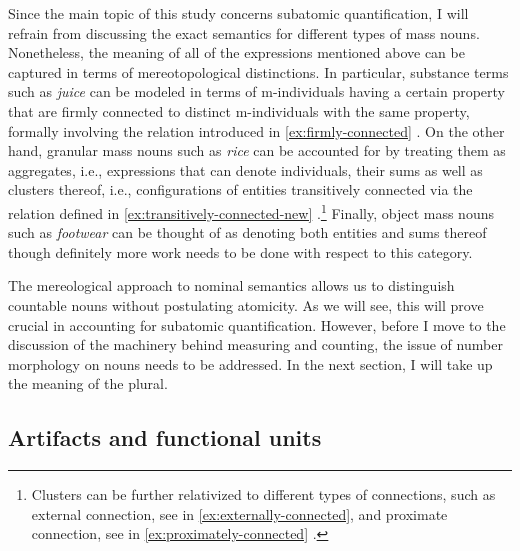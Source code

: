 	Since the main topic of this study concerns subatomic quantification, I will refrain from discussing the exact semantics for different types of mass nouns. Nonetheless, the meaning of all of the expressions mentioned above can be captured in terms of mereotopological distinctions. In particular, substance terms such as \textit{juice} can be modeled in terms of m-individuals having a certain property that are firmly connected to distinct m-individuals with the same property, formally involving the  relation introduced in \ref{ex:firmly-connected} \citep[see][pp. 140--142]{grimm2012number}. On the other hand, granular mass nouns such as \textit{rice} can be accounted for by treating them as aggregates, i.e., expressions that can denote  individuals, their sums as well as clusters thereof, i.e., configurations of  entities transitively connected via the  relation defined in \ref{ex:transitively-connected-new} \citep[see][pp. 142--148]{grimm2012number}.\footnote{Clusters can be further relativized to different types of connections, such as external connection, see  in \ref{ex:externally-connected}, and proximate connection, see  in \ref{ex:proximately-connected} \citep{grimm2012number}.} Finally, object mass nouns such as \textit{footwear} can be thought of as denoting both  entities and sums thereof though definitely more work needs to be done with respect to this category.
	
	\begin{sloppypar}
	The mereological approach to nominal semantics allows us to distinguish countable nouns without postulating atomicity. As we will see, this will prove crucial in accounting for subatomic quantification. However, before I move to the discussion of the machinery behind measuring and counting, the issue of number morphology on nouns needs to be addressed. In the next section, I will take up the meaning of the plural.
	\end{sloppypar}
	
	\subsection{Artifacts and functional units}\label{sec:functional-units}
	
